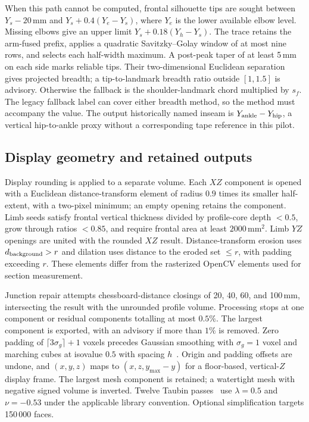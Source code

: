 \documentclass[11pt,a4paper]{article}
\begin{document}
When this path cannot be computed, frontal silhouette tips are sought between $Y_s-20$\,mm and $Y_s+0.4(Y_e-Y_s)$, where $Y_e$ is the lower available elbow level. Missing elbows give an upper limit $Y_s+0.18(Y_h-Y_s)$. The trace retains the arm-fused prefix, applies a quadratic Savitzky--Golay window of at most nine rows, and selects each half-width maximum. A post-peak taper of at least 5\,mm on each side marks reliable tips. Their two-dimensional Euclidean separation gives projected breadth; a tip-to-landmark breadth ratio outside $[1,1.5]$ is advisory. Otherwise the fallback is the shoulder-landmark chord multiplied by $s_f$. The legacy fallback label can cover either breadth method, so the method must accompany the value. The output historically named inseam is $Y_{\rm ankle}-Y_{\rm hip}$, a vertical hip-to-ankle proxy without a corresponding tape reference in this pilot.

\subsection{Display geometry and retained outputs}
Display rounding is applied to a separate volume. Each $XZ$ component is opened with a Euclidean distance-transform element of radius $0.9$ times its smaller half-extent, with a two-pixel minimum; an empty opening retains the component. Limb seeds satisfy frontal vertical thickness divided by profile-core depth $<0.5$, grow through ratios $<0.85$, and require frontal area at least $2000$\,mm$^2$. Limb $YZ$ openings are united with the rounded $XZ$ result. Distance-transform erosion uses $d_{\rm background}>r$ and dilation uses distance to the eroded set $\leq r$, with padding exceeding $r$. These elements differ from the rasterized OpenCV elements used for section measurement.

Junction repair attempts chessboard-distance closings of 20, 40, 60, and 100\,mm, intersecting the result with the unrounded profile volume. Processing stops at one component or residual components totalling at most $0.5\%$. The largest component is exported, with an advisory if more than $1\%$ is removed. Zero padding of $\lceil3\sigma_g\rceil+1$ voxels precedes Gaussian smoothing with $\sigma_g=1$ voxel and marching cubes at isovalue $0.5$ with spacing $h$~\cite{lorensen1987marching}. Origin and padding offsets are undone, and $(x,y,z)$ maps to $(x,z,y_{\max}-y)$ for a floor-based, vertical-$Z$ display frame. The largest mesh component is retained; a watertight mesh with negative signed volume is inverted. Twelve Taubin passes~\cite{taubin1995signal} use $\lambda=0.5$ and $\nu=-0.53$ under the applicable library convention. Optional simplification targets 150\,000 faces.
\end{document}
